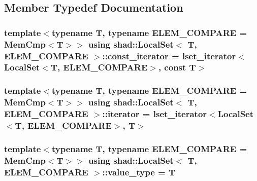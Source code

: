 \subsection{Member Typedef Documentation}
\hypertarget{classshad_1_1LocalSet_a3a1104a2552f91dcdf37b057440ba182}{
\subsubsection[{const\-\_\-iterator}]{\setlength{\rightskip}{0pt plus 5cm}template$<$typename T, typename E\-L\-E\-M\-\_\-\-C\-O\-M\-P\-A\-R\-E = Mem\-Cmp$<$\-T$>$$>$ using {\bf shad\-::\-Local\-Set}$<$ T, E\-L\-E\-M\-\_\-\-C\-O\-M\-P\-A\-R\-E $>$\-::{\bf const\-\_\-iterator} =  {\bf lset\-\_\-iterator}$<${\bf Local\-Set}$<$T, E\-L\-E\-M\-\_\-\-C\-O\-M\-P\-A\-R\-E$>$, const T$>$}}\label{classshad_1_1LocalSet_a3a1104a2552f91dcdf37b057440ba182}
\hypertarget{classshad_1_1LocalSet_aea5fcaed21331e4dcb23811bc3f59e0d}{
\subsubsection[{iterator}]{\setlength{\rightskip}{0pt plus 5cm}template$<$typename T, typename E\-L\-E\-M\-\_\-\-C\-O\-M\-P\-A\-R\-E = Mem\-Cmp$<$\-T$>$$>$ using {\bf shad\-::\-Local\-Set}$<$ T, E\-L\-E\-M\-\_\-\-C\-O\-M\-P\-A\-R\-E $>$\-::{\bf iterator} =  {\bf lset\-\_\-iterator}$<${\bf Local\-Set}$<$T, E\-L\-E\-M\-\_\-\-C\-O\-M\-P\-A\-R\-E$>$, T$>$}}\label{classshad_1_1LocalSet_aea5fcaed21331e4dcb23811bc3f59e0d}
\hypertarget{classshad_1_1LocalSet_a2116351b475e6f8cb21f78f11486e9e7}{
\subsubsection[{value\-\_\-type}]{\setlength{\rightskip}{0pt plus 5cm}template$<$typename T, typename E\-L\-E\-M\-\_\-\-C\-O\-M\-P\-A\-R\-E = Mem\-Cmp$<$\-T$>$$>$ using {\bf shad\-::\-Local\-Set}$<$ T, E\-L\-E\-M\-\_\-\-C\-O\-M\-P\-A\-R\-E $>$\-::{\bf value\-\_\-type} =  T}}\label{classshad_1_1LocalSet_a2116351b475e6f8cb21f78f11486e9e7}


